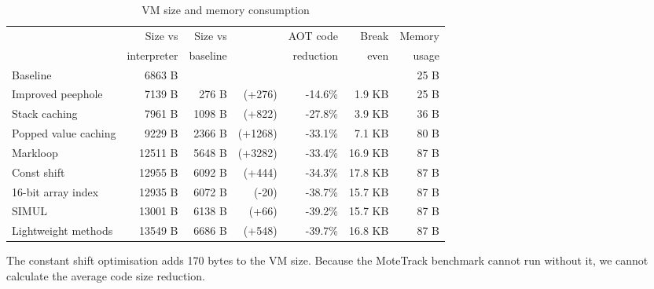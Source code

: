 \begin{table}
\centering
\caption{VM size and memory consumption}
\label{tbl-code-size-and-memory-consumption}
    \begin{threeparttable}
    \begin{tabular}{lrrrrrr} %
    \toprule
                              & Size vs     & Size vs  &                      & AOT code  &   Break & Memory    \\
                              & interpreter & baseline &                      & reduction &   even  & usage     \\
    \midrule
    \midrule
    Baseline                  &     6863 B  &          &                      &           &         & 25 B      \\
    Improved peephole         &     7139 B  &   276 B  & \scriptsize   (+276) &  -14.6\%  &  1.9 KB & 25 B      \\
    Stack caching             &     7961 B  &  1098 B  & \scriptsize   (+822) &  -27.8\%  &  3.9 KB & 36 B      \\
    Popped value caching      &     9229 B  &  2366 B  & \scriptsize  (+1268) &  -33.1\%  &  7.1 KB & 80 B      \\
    Markloop                  &    12511 B  &  5648 B  & \scriptsize  (+3282) &  -33.4\%  & 16.9 KB & 87 B      \\
    Const shift               &    12955 B  &  6092 B  & \scriptsize   (+444) &  -34.3\%  & 17.8 KB & 87 B      \\
    16-bit array index        &    12935 B  &  6072 B  & \scriptsize    (-20) &  -38.7\%  & 15.7 KB & 87 B      \\
    SIMUL                     &    13001 B  &  6138 B  & \scriptsize    (+66) &  -39.2\%  & 15.7 KB & 87 B      \\
    Lightweight methods       &    13549 B  &  6686 B  & \scriptsize   (+548) &  -39.7\%  & 16.8 KB & 87 B      \\
    \bottomrule
    \end{tabular}
    \begin{tablenotes}
        \item The constant shift optimisation adds 170 bytes to the VM size. Because the MoteTrack benchmark cannot run without it, we cannot calculate the average code size reduction.
    \end{tablenotes}
    \end{threeparttable}
\end{table}
